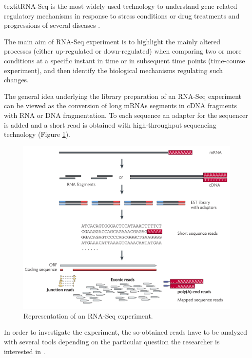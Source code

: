 textit{RNA-Seq} \cite{Thermes2014, Wang2009, Costa2010, Ozsolak2011} is the most widely used technology to understand gene related regulatory mechanisms in response to stress conditions or drug treatments and progressions of several diseases \cite{Costa2013}.

The main aim of RNA-Seq experiment is to highlight the mainly altered processes (either up-regulated or down-regulated) when comparing two or more conditions at a specific instant in time or in subsequent time points (time-course experiment), and then identify the biological mechanisms regulating such changes.

The general idea underlying the library preparation of an RNA-Seq experiment can be viewed as the conversion of long mRNAs segments in cDNA fragments with RNA or DNA fragmentation. 
To each sequence an adapter for the sequencer is added and a short read is obtained with high-throughput sequencing technology (Figure \ref{fig:rnaseqexp}).


\begin{figure}[h]
\includegraphics[width=\textwidth,height=\textheight,keepaspectratio]{img/intro/rna-seq.png}
\caption[RNA-Seq experiment]{Representation of an RNA-Seq experiment. \cite{Wang2009}}
\label{fig:rnaseqexp}
\centering
\end{figure}

In order to investigate the experiment, the so-obtained reads have to be analyzed with several tools depending on the particular question the researcher is interested in \cite{Pepke2009, Oshlack2010}.

